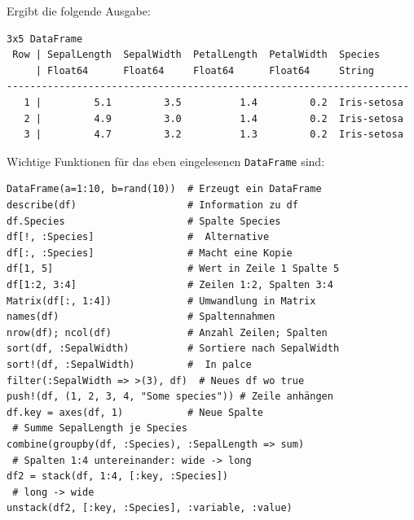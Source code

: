 \documentclass[10pt,twocolumn]{scrartcl}
\begin{document}
Ergibt die folgende Ausgabe:
\begin{lstlisting}[basicstyle=\scriptsize]
3x5 DataFrame
 Row | SepalLength  SepalWidth  PetalLength  PetalWidth  Species
     | Float64      Float64     Float64      Float64     String
---------------------------------------------------------------------
   1 |         5.1         3.5          1.4         0.2  Iris-setosa
   2 |         4.9         3.0          1.4         0.2  Iris-setosa
   3 |         4.7         3.2          1.3         0.2  Iris-setosa
\end{lstlisting}

Wichtige Funktionen für das eben eingelesenen \lstinline|DataFrame| sind:

\begin{lstlisting}
DataFrame(a=1:10, b=rand(10))  # Erzeugt ein DataFrame
describe(df)                   # Information zu df
df.Species                     # Spalte Species
df[!, :Species]                #  Alternative
df[:, :Species]                # Macht eine Kopie
df[1, 5]                       # Wert in Zeile 1 Spalte 5
df[1:2, 3:4]                   # Zeilen 1:2, Spalten 3:4
Matrix(df[:, 1:4])             # Umwandlung in Matrix
names(df)                      # Spaltennahmen
nrow(df); ncol(df)             # Anzahl Zeilen; Spalten
sort(df, :SepalWidth)          # Sortiere nach SepalWidth
sort!(df, :SepalWidth)         #  In palce
filter(:SepalWidth => >(3), df)  # Neues df wo true
push!(df, (1, 2, 3, 4, "Some species")) # Zeile anhängen
df.key = axes(df, 1)           # Neue Spalte
 # Summe SepalLength je Species
combine(groupby(df, :Species), :SepalLength => sum)
 # Spalten 1:4 untereinander: wide -> long
df2 = stack(df, 1:4, [:key, :Species])
 # long -> wide
unstack(df2, [:key, :Species], :variable, :value)
\end{lstlisting}


\end{document}
